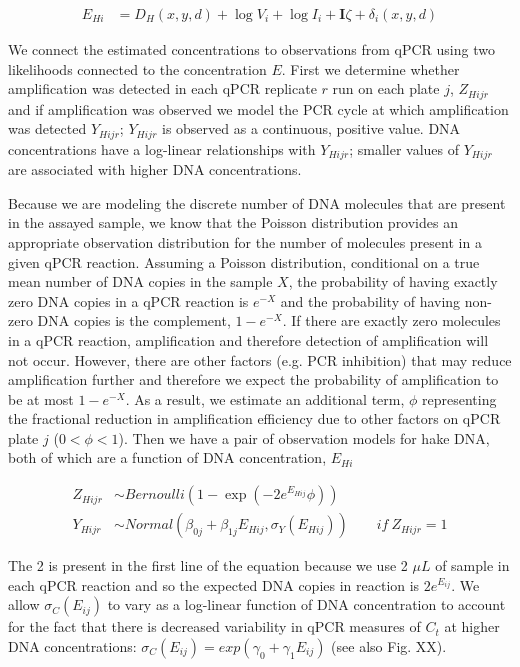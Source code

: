 \documentclass{article}
\begin{document}
\begin{align}
  E_{Hi} &= D_H({x,y,d}) +  \log{V_i} + \log{I_i} + \mathbf{I}\zeta + \delta_i(x,y,d)
\end{align}

We connect the estimated concentrations to observations from qPCR using two likelihoods connected to the concentration $E$. First we determine whether amplification was detected in each qPCR replicate $r$ run on each plate $j$, $Z_{Hijr}$ and if amplification was observed we model the PCR cycle at which amplification was detected $Y_{Hijr}$; $Y_{Hijr}$ is observed as a continuous, positive value. DNA concentrations have a log-linear relationships with $Y_{Hijr}$; smaller values of $Y_{Hijr}$ are associated with higher DNA concentrations. 

Because we are modeling the discrete number of DNA molecules that are present in the assayed sample, we know that the Poisson distribution provides an appropriate observation distribution for the number of molecules present in a given qPCR reaction. Assuming a Poisson distribution, conditional on a true mean number of DNA copies in the sample $X$, the probability of having exactly zero DNA copies in a qPCR reaction is $e^{-X}$ and the probability of having non-zero DNA copies is the complement, $1-e^{-X}$. If there are exactly zero molecules in a qPCR reaction, amplification and therefore detection of amplification will not occur. However, there are other factors (e.g. PCR inhibition) that may reduce amplification further and therefore we expect the probability of amplification to be at most $1-e^{-X}$. As a result, we estimate an additional term, $\phi$ representing the fractional reduction in amplification efficiency due to other factors on qPCR plate $j$ ($0<\phi<1$). Then we have a pair of observation models for hake DNA, both of which are a function of DNA concentration, $E_{Hi}$

\begin{align}
  Z_{Hijr} &\sim Bernoulli\left(1 - \exp(-2 e^{E_{Hij}}\phi) \right) \\ 
  Y_{Hijr} &\sim Normal \left(\beta_{0j}+\beta_{1j}{E_{Hij}},\sigma_Y(E_{Hij}) \right) \qquad  if \: Z_{Hijr} = 1 
\end{align} 

The 2 is present in the first line of the equation because we use 2 $\mu L$ of sample in each qPCR reaction and so the expected DNA copies in reaction is $2e^{E_{ij}}$. We allow $\sigma_C(E_{ij})$ to vary as a log-linear function of DNA concentration to account for the fact that there is decreased variability in qPCR measures of $C_t$ at higher DNA concentrations: $\sigma_C({E_{ij}}) = exp(\gamma_{0}+\gamma_{1}E_{ij})$ (see also Fig. XX).
\end{document}
